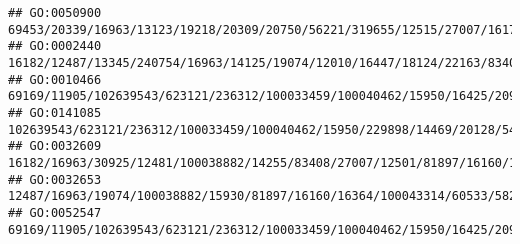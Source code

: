 \documentclass[
]{article}
\begin{document}
\begin{verbatim}
## GO:0050900                                                                                                                                                                                              69453/20339/16963/13123/19218/20309/20750/56221/319655/12515/27007/16170/20299/76527/20443/12145/20306/20307/20304/20303/12775/65256/56838/21943/110168/321019/16421/11815/245195/71223/12458/11629/16149/12766
## GO:0002440                                                                                                                                                                                                                              16182/12487/13345/240754/16963/14125/19074/12010/16447/18124/22163/83408/12483/243958/24099/69550/81897/215900/22364/16160/327957/58185/100503545/12458/69816/16149/20371/12229
## GO:0010466                                                                                                                                                                                                                                   69169/11905/102639543/623121/236312/100033459/100040462/15950/16425/209378/13011/20568/20617/12047/18054/20701/20704/71907/15160/268885/433016/20861/100034684/20862/15511
## GO:0141085                                                                                                                                                                                                                                                                                                                      102639543/623121/236312/100033459/100040462/15950/229898/14469/20128/54483/224762/12229
## GO:0032609                                                                                                                                                                                                                                                                                       16182/16963/30925/12481/100038882/14255/83408/27007/12501/81897/16160/12775/72049/57757/110558/12475/60533/58205/20371
## GO:0032653                                                                                                                                                                                                                                                                                                                        12487/16963/19074/100038882/15930/81897/16160/16364/100043314/60533/58205/20371/12229
## GO:0052547                                                                                                                                                                                   69169/11905/102639543/623121/236312/100033459/100040462/15950/16425/209378/13011/20568/12578/20617/12047/18054/76884/18053/20701/20704/71907/18095/54483/15160/268885/433016/20861/100034684/20862/19876/16912/16913/15511

\end{verbatim}
\end{document}
